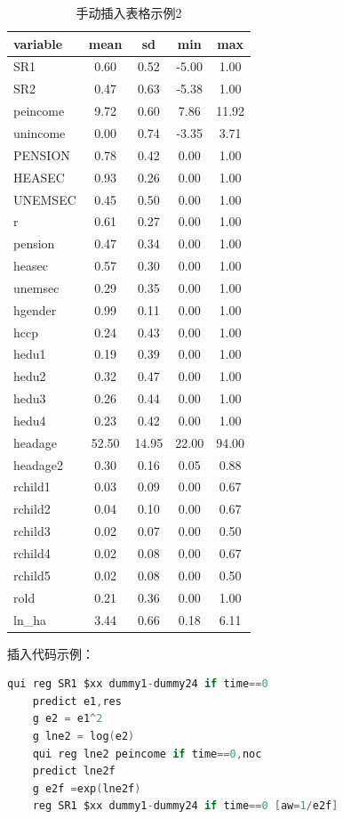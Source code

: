 \documentclass[a4paper,12pt]{report}
\begin{document}
\begin{table}
    \caption{手动插入表格示例2}
    \centering
    \begin{tabular}{lcccc}
        \toprule[1.5pt]
        variable & mean & sd & min & max \\ 
        \midrule[1.0pt]
        SR1 & 0.60 & 0.52 & -5.00 & 1.00 \\ 
        SR2 & 0.47 & 0.63 & -5.38 & 1.00 \\ 
        peincome & 9.72 & 0.60 & 7.86 & 11.92 \\ 
        unincome & 0.00 & 0.74 & -3.35 & 3.71 \\ 
        PENSION & 0.78 & 0.42 & 0.00 & 1.00 \\ 
        HEASEC & 0.93 & 0.26 & 0.00 & 1.00 \\ 
        UNEMSEC & 0.45 & 0.50 & 0.00 & 1.00 \\ 
        r & 0.61 & 0.27 & 0.00 & 1.00 \\ 
        pension & 0.47 & 0.34 & 0.00 & 1.00 \\ 
        heasec & 0.57 & 0.30 & 0.00 & 1.00 \\ 
        unemsec & 0.29 & 0.35 & 0.00 & 1.00 \\ 
        hgender & 0.99 & 0.11 & 0.00 & 1.00 \\ 
        hccp & 0.24 & 0.43 & 0.00 & 1.00 \\ 
        hedu1 & 0.19 & 0.39 & 0.00 & 1.00 \\ 
        hedu2 & 0.32 & 0.47 & 0.00 & 1.00 \\ 
        hedu3 & 0.26 & 0.44 & 0.00 & 1.00 \\ 
        hedu4 & 0.23 & 0.42 & 0.00 & 1.00 \\ 
        headage & 52.50 & 14.95 & 22.00 & 94.00 \\ 
        headage2 & 0.30 & 0.16 & 0.05 & 0.88 \\ 
        rchild1 & 0.03 & 0.09 & 0.00 & 0.67 \\ 
        rchild2 & 0.04 & 0.10 & 0.00 & 0.67 \\ 
        rchild3 & 0.02 & 0.07 & 0.00 & 0.50 \\ 
        rchild4 & 0.02 & 0.08 & 0.00 & 0.67 \\ 
        rchild5 & 0.02 & 0.08 & 0.00 & 0.50 \\ 
        rold & 0.21 & 0.36 & 0.00 & 1.00 \\ 
        ln\_ha & 3.44 & 0.66 & 0.18 & 6.11 \\ 
        \bottomrule[1.5pt]
    \end{tabular}
    \label{hhh}
\end{table}


插入代码示例：
\begin{lstlisting}[language=C]
    qui reg SR1 $xx dummy1-dummy24 if time==0
    predict e1,res
    g e2 = e1^2
    g lne2 = log(e2)
    qui reg lne2 peincome if time==0,noc
    predict lne2f
    g e2f =exp(lne2f)
    reg SR1 $xx dummy1-dummy24 if time==0 [aw=1/e2f]
\end{lstlisting}


\printbibliography
\end{document}

